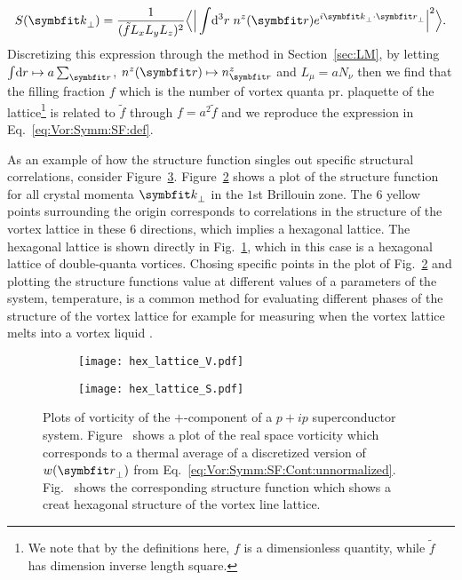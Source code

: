 \begin{equation}
    \label{eq:Vor:Symm:SF:Cont:structureFunction}
    S(\v{k}_\perp) = \frac{1}{(\tilde{f}L_xL_yL_z)^2}\Big\langle\Big|\int\!\mathrm{d}^3r\;n^z(\v{r})e^{i\v{k}_\perp\cdot\v{r}_\perp}\Big|^2\Big\rangle.
\end{equation}
Discretizing this expression through the method in Section~\ref{sec:LM}, \ie by letting $\int\!\mathrm{d}r\mapsto a\sum_\v{r}$, $n^z(\v{r})\mapsto n^z_\v{r}$ and $L_\mu = aN_\nu$ then
we find that the filling fraction $f$ which is the number of vortex quanta pr. plaquette of the lattice\footnote{We note that by the definitions here, $f$ is a dimensionless quantity, while $\tilde{f}$ has dimension inverse length square.} is related to $\tilde{f}$ through $f = a^2\tilde{f}$ and we reproduce the expression in
Eq.~\eqref{eq:Vor:Symm:SF:def}.

As an example of how the structure function singles out specific structural correlations, consider Figure~\ref{fig:Vor:Symm:SF:hex}. Figure~\ref{fig:Vor:Symm:SF:hex:S} shows a plot of the structure
function for all crystal momenta $\v{k}_\perp$ in the $1$st Brillouin zone. The $6$ yellow points surrounding the origin corresponds to correlations in the structure of the vortex lattice in these
$6$ directions, which implies a hexagonal lattice. The hexagonal lattice is shown directly in Fig.~\ref{fig:Vor:Symm:SF:hex:V}, which in this case is a hexagonal lattice of double-quanta vortices.
Chosing specific points in the plot of Fig.~\ref{fig:Vor:Symm:SF:hex:S} and plotting the structure functions value at different values of a parameters of the system, \eg temperature, is a common
method for evaluating different phases of the structure of the vortex lattice for example for measuring when the vortex lattice melts into a vortex liquid 
\cite{Smorgrav05,Smiseth05,NguyenPhase98,Nguyen96,NguyenOnsager98}.

\begin{figure}[h]
    \newcommand{\fractionwidth}{.45}
    \centering
    \begin{subfigure}[b]{\fractionwidth\textwidth}
        \centering
        \texttt{[image: hex\_lattice\_V.pdf]}
        \caption{\label{fig:Vor:Symm:SF:hex:V}}
    \end{subfigure}
    \hspace{2em}
    \begin{subfigure}[b]{\fractionwidth\textwidth}
        \centering
        \texttt{[image: hex\_lattice\_S.pdf]}
        \caption{\label{fig:Vor:Symm:SF:hex:S}}
    \end{subfigure}
    \caption{Plots of vorticity of the $+$-component of a $p+ip$ superconductor system. Figure~\protect{} shows a plot of the real space vorticity which corresponds to a thermal average of a discretized version of $w(\v{r}_\perp)$ from Eq.~\eqref{eq:Vor:Symm:SF:Cont:unnormalized}. Fig.~\protect{} shows the corresponding structure function which shows a creat hexagonal structure of the vortex line lattice.}
    \label{fig:Vor:Symm:SF:hex}
\end{figure}

